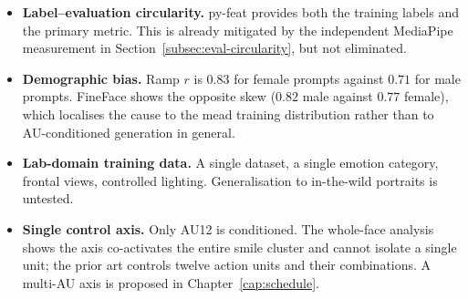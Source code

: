\begin{itemize}
    \item \textbf{Label--evaluation circularity.} py-feat provides both the training labels and the primary metric. This is already mitigated by the independent MediaPipe measurement in Section~\ref{subsec:eval-circularity}, but not eliminated.
    \item \textbf{Demographic bias.} Ramp $r$ is $0.83$ for female prompts against $0.71$ for male prompts. FineFace shows the opposite skew ($0.82$ male against $0.77$ female), which localises the cause to the \gls{mead} training distribution rather than to AU-conditioned generation in general.
    \item \textbf{Lab-domain training data.} A single dataset, a single emotion category, frontal views, controlled lighting. Generalisation to in-the-wild portraits is untested.
    \item \textbf{Single control axis.} Only AU12 is conditioned. The whole-face analysis shows the axis co-activates the entire smile cluster and cannot isolate a single unit; the prior art controls twelve action units and their combinations. A multi-AU axis is proposed in Chapter~\ref{cap:schedule}.
\end{itemize}
